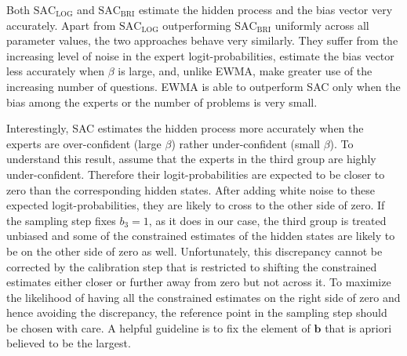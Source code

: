 \documentclass[aoas, preprint]{imsart}
\numberwithin{equation}{section}
\theoremstyle{plain}
\begin{document}
Both $\text{SAC}_{\text{LOG}}$ and  $\text{SAC}_{\text{BRI}}$ estimate the hidden process and the bias vector very accurately. Apart from $\text{SAC}_{\text{LOG}}$ outperforming $\text{SAC}_{\text{BRI}}$ uniformly across all parameter values, the two approaches behave very similarly.  They suffer  from the increasing level of noise in the expert logit-probabilities, estimate the bias vector less accurately when $\beta$ is large, and, unlike EWMA, make greater use of the increasing number of questions.  EWMA is able to outperform SAC only when the bias among the experts or the number of problems is very small. 

Interestingly, SAC estimates the hidden process more accurately when the experts are over-confident (large $\beta$) rather under-confident (small $\beta$). To understand this result, assume that the experts in the third group are highly under-confident. Therefore their logit-probabilities are expected to be closer to zero than the corresponding hidden states. After adding white noise to these expected logit-probabilities, they are likely to cross to the other side of zero. If the sampling step fixes $b_3 = 1$, as it does in our case, the third group is treated unbiased and some of the constrained estimates of the hidden states are likely to be on the other side of zero as well. Unfortunately, this discrepancy cannot be corrected by the calibration step that is restricted to shifting the constrained estimates either closer or further away from zero but not across it. To maximize the likelihood of having all the constrained estimates on the right side of zero and hence avoiding the discrepancy, the reference point in the sampling step should be chosen with care. A helpful guideline is to fix the element of $\boldsymbol{b}$ that is apriori believed  to be the largest. 



%
%
%
%
\end{document}
